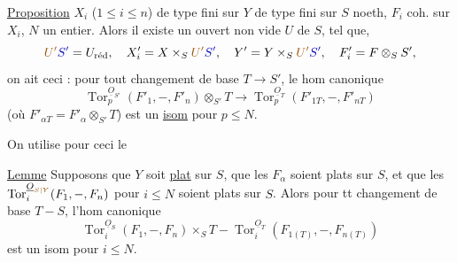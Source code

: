 \uline{Proposition} $X_i$ ($1\leq i\leq n$) de type fini sur $Y$ de type fini sur $S$ noeth, $F_i$ coh. sur $X_i$, $N$ un entier. Alors il existe un  ouvert non vide $U$ de $S$, tel que,  
\[
\deleted{\unsure{U'}}\inserted{S'}=U_{\text{réd}},\quad X'_i=X\times_S\deleted{\unsure{U'}}\inserted{S'},\quad Y'=Y\times_S\deleted{\unsure{U'}}\inserted{S'},\quad F'_i=F\otimes_S S',
\]
on ait ceci : pour tout changement de base $T\longrightarrow S'$, le hom canonique
\[
\operatorname{Tor}_p^{\underline O_{S'}}(F'_1,-,F'_n)\otimes_{S'}T\longrightarrow\operatorname{Tor}_p^{\underline O_T}(F'_{1T},-,F'_{nT})
\]
(où $F'_{\alpha T}=F'_\alpha\otimes_{S'}T$) est un \uline{isom} pour $p\leq N$.

On utilise pour ceci le

\uline{Lemme}  Supposons que $Y$ soit \uline{plat} sur $S$, que les $F_\alpha$ soient plats sur $S$, et que les $\operatorname{Tor}_i^{\underline O_{\unsure{S|Y}}}(F_1,-,F_n)$ pour $i\leq N$ soient plats sur $S$. Alors pour tt changement de base $T-S$, l'hom canonique
\[
\operatorname{Tor}_i^{\underline O_S}(F_1,-,F_n)\times_S T-\operatorname{Tor}_i^{\underline O_T}(F_{1(T)},-,F_{n(T)})
\]
est un isom pour $i\leq N$.

